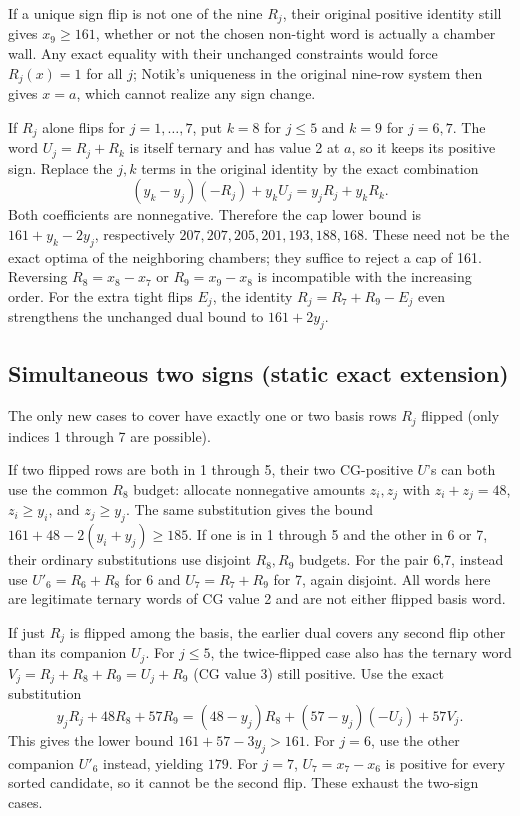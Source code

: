 \documentclass[
  11pt,
]{article}
\begin{document}
If a unique sign flip is not one of the nine \(R_j\), their original
positive identity still gives \(x_9\ge161\), whether or not the chosen
non-tight word is actually a chamber wall. Any exact equality with their
unchanged constraints would force \(R_j(x)=1\) for all \(j\); Notik's
uniqueness in the original nine-row system then gives \(x=a\), which
cannot realize any sign change.

If \(R_j\) alone flips for \(j=1,\ldots,7\), put \(k=8\) for \(j\le5\)
and \(k=9\) for \(j=6,7\). The word \(U_j=R_j+R_k\) is itself ternary
and has value 2 at \(a\), so it keeps its positive sign. Replace the
\(j,k\) terms in the original identity by the exact combination \[
 (y_k-y_j)(-R_j)+y_kU_j=y_jR_j+y_kR_k .
\] Both coefficients are nonnegative. Therefore the cap lower bound is
\(161+y_k-2y_j\), respectively \(207,207,205,201,193,188,168\). These
need not be the exact optima of the neighboring chambers; they suffice
to reject a cap of 161. Reversing \(R_8=x_8-x_7\) or \(R_9=x_9-x_8\) is
incompatible with the increasing order. For the extra tight flips
\(E_j\), the identity \(R_j=R_7+R_9-E_j\) even strengthens the unchanged
dual bound to \(161+2y_j\).

\subsection{Simultaneous two signs (static exact
extension)}\label{simultaneous-two-signs-static-exact-extension}

The only new cases to cover have exactly one or two basis rows \(R_j\)
flipped (only indices 1 through 7 are possible).

If two flipped rows are both in 1 through 5, their two CG-positive
\(U\)'s can both use the common \(R_8\) budget: allocate nonnegative
amounts \(z_i,z_j\) with \(z_i+z_j=48\), \(z_i\ge y_i\), and
\(z_j\ge y_j\). The same substitution gives the bound
\(161+48-2(y_i+y_j)\ge185\). If one is in 1 through 5 and the other in 6
or 7, their ordinary substitutions use disjoint \(R_8,R_9\) budgets. For
the pair 6,7, instead use \(U'_6=R_6+R_8\) for 6 and \(U_7=R_7+R_9\) for
7, again disjoint. All words here are legitimate ternary words of CG
value 2 and are not either flipped basis word.

If just \(R_j\) is flipped among the basis, the earlier dual covers any
second flip other than its companion \(U_j\). For \(j\le5\), the
twice-flipped case also has the ternary word \(V_j=R_j+R_8+R_9=U_j+R_9\)
(CG value 3) still positive. Use the exact substitution \[
y_jR_j+48R_8+57R_9
=(48-y_j)R_8+(57-y_j)(-U_j)+57V_j .
\] This gives the lower bound \(161+57-3y_j>161\). For \(j=6\), use the
other companion \(U'_6\) instead, yielding \(179\). For \(j=7\),
\(U_7=x_7-x_6\) is positive for every sorted candidate, so it cannot be
the second flip. These exhaust the two-sign cases.
\end{document}
